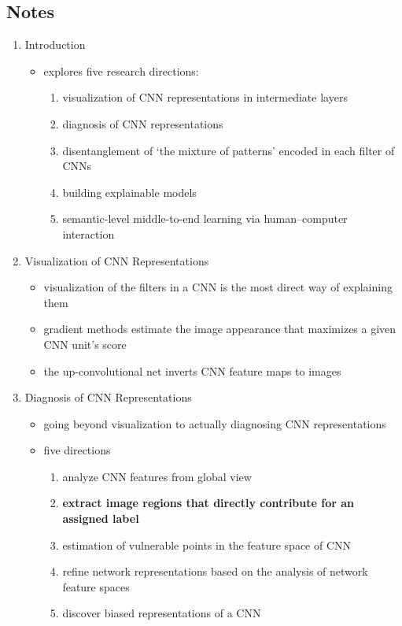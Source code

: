 \documentclass{article}
\begin{document}
\subsection*{Notes}

\begin{enumerate}
	\item Introduction
	\begin{itemize}
		\item explores five research directions:
		\begin{enumerate}
			\item visualization of CNN representations in intermediate layers
			\item diagnosis of CNN representations
			\item disentanglement of ‘the mixture of patterns’ encoded in each filter of CNNs
			\item building explainable models
			\item semantic-level middle-to-end learning via human–computer interaction
		\end{enumerate}
	\end{itemize}
	\item Visualization of CNN Representations
	\begin{itemize}
		\item visualization of the filters in a CNN is the most direct way of explaining them
		\item gradient methods estimate the image appearance that maximizes a given CNN unit's score
		\item the up-convolutional net inverts CNN feature maps to images
	\end{itemize}
	\item Diagnosis of CNN Representations
	\begin{itemize}
		\item going beyond visualization to actually diagnosing CNN representations
		\item five directions
		\begin{enumerate}
			\item analyze CNN features from global view
			\item \textbf{extract image regions that directly contribute for an assigned label}
			\item estimation of vulnerable points in the feature space of CNN
			\item refine network representations based on the analysis of network feature spaces
			\item discover biased representations of a CNN

\end{enumerate}
\end{itemize}
\end{enumerate}
\end{document}

